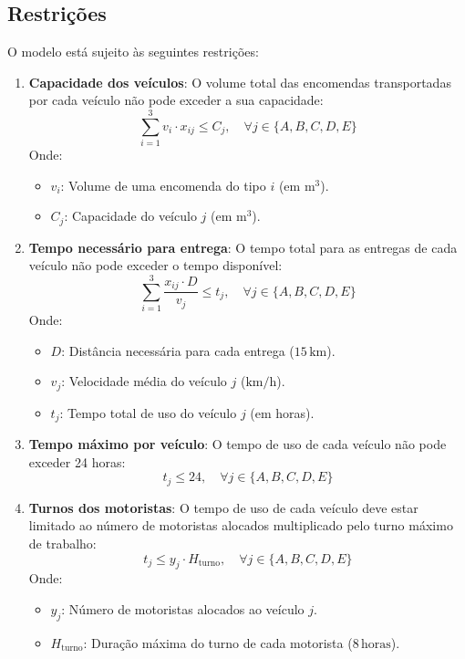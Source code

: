 \subsection{Restrições}\label{subsec:restricoes}
O modelo está sujeito às seguintes restrições:
\begin{enumerate}
    \item \textbf{Capacidade dos veículos}: O volume total das encomendas transportadas por cada veículo não pode exceder a sua capacidade:
    \[
        \sum_{i=1}^{3} v_i \cdot x_{ij} \leq C_j, \quad \forall j \in \{A, B, C, D, E\}
    \]
    Onde:
    \begin{itemize}
        \item \( v_i \): Volume de uma encomenda do tipo \( i \) (em \( \mathrm{m^3} \)).
        \item \( C_j \): Capacidade do veículo \( j \) (em \( \mathrm{m^3} \)).
    \end{itemize}
    \item \textbf{Tempo necessário para entrega}: O tempo total para as entregas de cada veículo não pode exceder o tempo disponível:
    \[
        \sum_{i=1}^{3} \frac{x_{ij} \cdot D}{v_j} \leq t_j, \quad \forall j \in \{A, B, C, D, E\}
    \]
    Onde:
    \begin{itemize}
        \item \( D \): Distância necessária para cada entrega (\( 15 \, \mathrm{km} \)).
        \item \( v_j \): Velocidade média do veículo \( j \) (\( \mathrm{km/h} \)).
        \item \( t_j \): Tempo total de uso do veículo \( j \) (em horas).
    \end{itemize}
    \item \textbf{Tempo máximo por veículo}: O tempo de uso de cada veículo não pode exceder 24 horas:
    \[
        t_j \leq 24, \quad \forall j \in \{A, B, C, D, E\}
    \]
    \item \textbf{Turnos dos motoristas}: O tempo de uso de cada veículo deve estar limitado ao número de motoristas alocados multiplicado pelo turno máximo de trabalho:
    \[
        t_j \leq y_j \cdot H_{\text{turno}}, \quad \forall j \in \{A, B, C, D, E\}
    \]
    Onde:
    \begin{itemize}
        \item \( y_j \): Número de motoristas alocados ao veículo \( j \).
        \item \( H_{\text{turno}} \): Duração máxima do turno de cada motorista (\( 8 \, \mathrm{horas} \)).

\end{itemize}
\end{enumerate}
